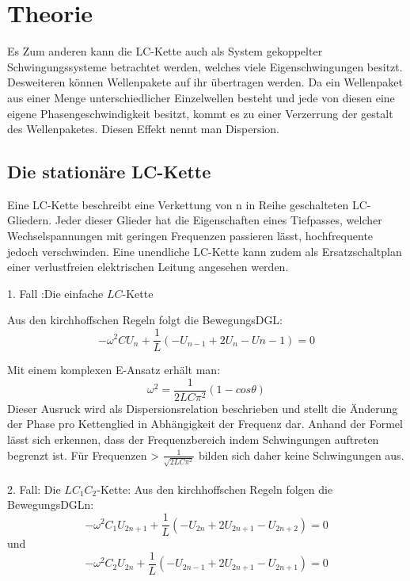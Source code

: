 
\section{Theorie}
\label{sec:Theorie}

 Es  Zum anderen kann die LC-Kette auch als System gekoppelter
    Schwingungssysteme betrachtet werden, welches viele Eigenschwingungen besitzt.
     Desweiteren können Wellenpakete auf ihr übertragen werden.
     Da ein Wellenpaket aus einer Menge unterschiedlicher Einzelwellen besteht
      und jede von diesen eine eigene Phasengeschwindigkeit besitzt, kommt es zu einer Verzerrung
  der gestalt des Wellenpaketes. Diesen Effekt nennt man Dispersion.

\subsection{Die stationäre LC-Kette}
Eine LC-Kette beschreibt eine Verkettung von n in Reihe geschalteten LC-Gliedern.
 Jeder dieser Glieder hat die Eigenschaften eines Tiefpasses, welcher
  Wechselspannungen mit geringen Frequenzen passieren lässt, hochfrequente jedoch
   verschwinden. Eine unendliche LC-Kette kann zudem als Ersatzschaltplan einer
    verlustfreien elektrischen Leitung angesehen werden.

1. Fall :Die einfache $LC$-Kette

Aus den kirchhoffschen Regeln folgt die BewegungsDGL:
\begin{equation}
- \omega ^2 C U_n + \frac{1}{L} \left( -U_{n-1} + 2U_ n -U{n-1} \right) = 0
\end{equation}

Mit einem komplexen E-Ansatz erhält man:
\begin{equation}
\omega ^2 = \frac{1}{2LC\pi^2}(1-cos\theta)
\end{equation}
Dieser Ausruck wird als Dispersionsrelation beschrieben und stellt die Änderung
 der Phase pro Kettenglied in Abhängigkeit der Frequenz dar. Anhand der Formel lässt sich erkennen,
  dass der Frequenzbereich indem Schwingungen auftreten begrenzt ist. Für Frequenzen >
 $\frac{1}{\sqrt{2LC\pi^2}}$ bilden sich daher keine Schwingungen aus.\\\\

 2. Fall: Die $LC_1C_2$-Kette:
 Aus den kirchhoffschen Regeln folgen die BewegungsDGLn:
 \begin{equation}
   -\omega^2 C_1 U_{2n+1} + \frac{1}{L} \left( -U_{2n} + 2U_{2n+1} - U_{2n+2} \right) = 0
 \end{equation}
 und
 \begin{equation}
   -\omega^2 C_2 U_{2n} + \frac{1}{L} \left( -U_{2n-1} + 2U_{2n+1} - U_{2n+1} \right) = 0
 \end{equation}


